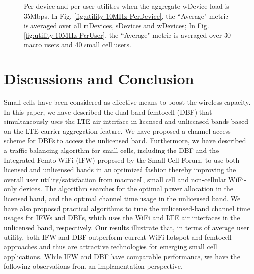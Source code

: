 \documentclass[journal,final,letterpaper,10pt,doublecolumn,twoside]{IEEEtran}
\begin{document}
\begin{figure*}[hpbt]
\centering {} \hfill
 \centering {}
\caption{ Per-device and per-user utilities  when the aggregate wDevice load is
35Mbps. In Fig. \ref{fig:utility-10MHz-PerDevice}, the ``Average" metric is
averaged over all mDevices, sDevices and wDevices; In Fig. \ref{fig:utility-10MHz-PerUser}, the ``Average" metric is
averaged over 30 macro users and 40 small cell users. } \label{fig:sim-10MHz}
\end{figure*}






\section{Discussions and Conclusion}\label{sec:conclusion}


Small cells have been considered as effective means to boost the
wireless capacity. In this paper, we have described the dual-band
femtocell (DBF) that simultaneously uses the LTE air interface in
licensed and unlicensed bands based on the LTE carrier aggregation
feature. We have proposed a channel access scheme for DBFs to access
the unlicensed band. Furthermore, we have described a traffic
balancing algorithm for small cells, including the DBF and the
Integrated Femto-WiFi (IFW) proposed by the Small Cell Forum, to  use
both licensed and unlicensed bands  in an optimized fashion thereby
improving the overall user utility/satisfaction from macrocell, small
cell and non-cellular WiFi-only devices. The algorithm searches for the
optimal power allocation in the licensed band, and the optimal
channel time usage in the unlicensed band. We have also proposed
practical algorithms to tune the unlicensed-band channel time usages
for IFWs and DBFs, which uses the WiFi and LTE air interfaces in the
unlicensed band, respectively.  Our results illustrate that, in
terms of average user utility, both IFW and DBF outperform current
WiFi hotspot and femtocell approaches  and thus are attractive
technologies for emerging small cell applications. While IFW and DBF
 have comparable performance, we have the following observations from an implementation
perspective.
\end{document}
